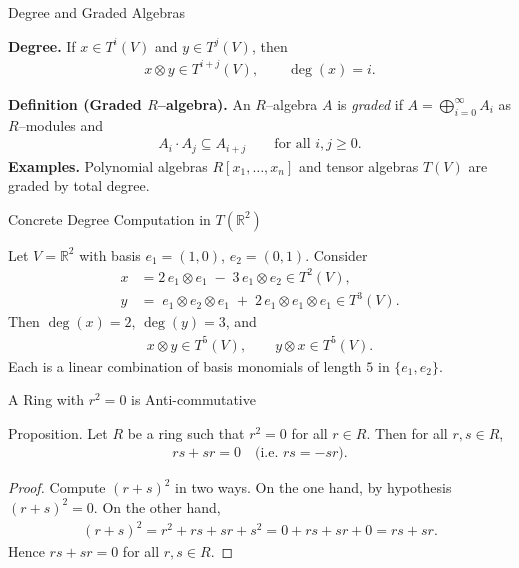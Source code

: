 \begin{frame}{Degree and Graded Algebras}
\begin{block}{}
\textbf{Degree.} If $x\in T^i(V)$ and $y\in T^j(V)$, then
\begin{align*}
x\otimes y \in T^{i+j}(V),\qquad \deg(x)=i.
\end{align*}

\textbf{Definition (Graded $R$–algebra).}
An $R$–algebra $A$ is \emph{graded} if $A=\bigoplus_{i=0}^\infty A_i$ as $R$–modules and
\begin{align*}
A_i\cdot A_j \subseteq A_{i+j}\qquad \text{for all } i,j\ge 0.
\end{align*}
\textbf{Examples.} Polynomial algebras $R[x_1,\dots,x_n]$ and tensor algebras $T(V)$ are graded by total degree.
\end{block}
\end{frame}

\begin{frame}{Concrete Degree Computation in $T(\mathbb{R}^2)$}
\begin{block}{}
Let $V=\mathbb{R}^2$ with basis $e_1=(1,0)$, $e_2=(0,1)$. Consider
\begin{align*}
x &= 2\,e_1\otimes e_1 \;-\; 3\,e_1\otimes e_2 \in T^2(V),\\
y &= \;e_1\otimes e_2\otimes e_1 \;+\; 2\,e_1\otimes e_1\otimes e_1 \in T^3(V).
\end{align*}
Then $\deg(x)=2$, $\deg(y)=3$, and
\begin{align*}
x\otimes y \in T^{5}(V),\qquad
y\otimes x \in T^{5}(V).
\end{align*}
Each is a linear combination of basis monomials of length $5$ in $\{e_1,e_2\}$.
\end{block}
\end{frame}

\begin{frame}{A Ring with $r^2=0$ is Anti-commutative}
\begin{block}{Proposition.}
Let $R$ be a ring such that $r^2=0$ for all $r\in R$. Then for all $r,s\in R$,
\begin{align*}
rs + sr = 0 \quad \text{(i.e.\ $rs=-sr$).}
\end{align*}
\end{block}

\begin{proof}
Compute $(r+s)^2$ in two ways. On the one hand, by hypothesis $(r+s)^2=0$.
On the other hand,
\begin{align*}
(r+s)^2 = r^2 + rs + sr + s^2 = 0 + rs + sr + 0 = rs + sr.
\end{align*}
Hence $rs+sr=0$ for all $r,s\in R$.
\end{proof}
\end{frame}

